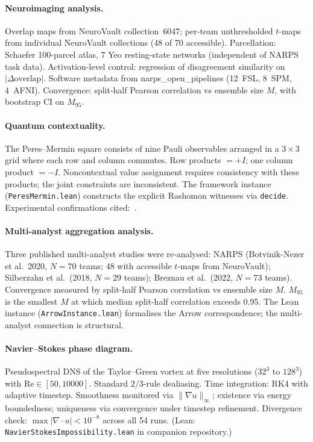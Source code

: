 \documentclass[11pt]{article}
\begin{document}
\paragraph{Neuroimaging analysis.}
Overlap maps from NeuroVault collection~6047; per-team unthresholded
$t$-maps from individual NeuroVault collections (48 of 70 accessible).
Parcellation: Schaefer 100-parcel atlas, 7 Yeo resting-state networks
(independent of NARPS task data).  Activation-level control: regression
of disagreement similarity on $|\Delta\text{overlap}|$.  Software
metadata from narps\_open\_pipelines (12~FSL, 8~SPM, 4~AFNI).
Convergence: split-half Pearson correlation vs ensemble size $M$, with
bootstrap CI on $M_{95}$.

\paragraph{Quantum contextuality.}
The Peres--Mermin square consists of nine Pauli observables arranged in
a $3 \times 3$ grid where each row and column commutes.  Row products $= +I$;
one column product $= -I$.  Noncontextual value assignment requires
consistency with these products; the joint constraints are inconsistent.
The framework instance (\texttt{PeresMermin.lean}) constructs the explicit
Rashomon witnesses via \texttt{decide}.  Experimental confirmations
cited:~\citet{kirchmair2009state,amselem2009state}.

\paragraph{Multi-analyst aggregation analysis.}
Three published multi-analyst studies were re-analysed: NARPS
(Botvinik-Nezer et al.~2020, $N = 70$ teams; 48 with accessible
$t$-maps from NeuroVault); Silberzahn et al.\ (2018, $N = 29$ teams);
Breznau et al.\ (2022, $N = 73$ teams).  Convergence measured by
split-half Pearson correlation vs ensemble size $M$.  $M_{95}$ is the
smallest $M$ at which median split-half correlation exceeds 0.95.
The Lean instance (\texttt{ArrowInstance.lean}) formalises the Arrow
correspondence; the multi-analyst connection is structural.

\paragraph{Navier--Stokes phase diagram.}
Pseudospectral DNS of the Taylor--Green vortex at five resolutions
($32^3$ to $128^3$) with $\mathrm{Re} \in [50, 10000]$.  Standard
$2/3$-rule dealiasing.  Time integration: RK4 with adaptive timestep.
Smoothness monitored via $\|\nabla u\|_\infty$; existence via energy
boundedness; uniqueness via convergence under timestep refinement.
Divergence check: $\max|\nabla \cdot u| < 10^{-8}$ across all 54 runs.
(Lean: \texttt{NavierStokesImpossibility.lean} in companion repository.)
\end{document}
